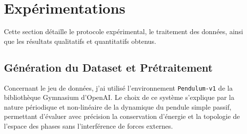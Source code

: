 \documentclass[11pt]{article}
\begin{document}
%

\section{Expérimentations}
\label{sec:experiments}

Cette section détaille le protocole expérimental, le traitement des données, ainsi que les résultats qualitatifs et quantitatifs obtenus.

\subsection{Génération du Dataset et Prétraitement}
Concernant le jeu de données, j'ai utilisé l'environnement \texttt{Pendulum-v1} de la bibliothèque Gymnasium d'OpenAI. Le choix de ce système s'explique par la nature périodique et non-linéaire de la dynamique du pendule simple passif, permettant d'évaluer avec précision la conservation d'énergie et la topologie de l'espace des phases sans l'interférence de forces externes.
\end{document}
